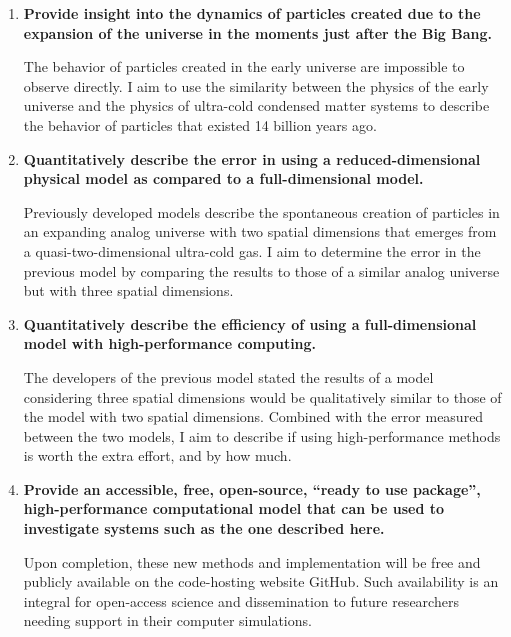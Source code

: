 \documentclass{article}
\begin{document}
        \begin{enumerate}
            \item \textbf{Provide insight into the dynamics of particles created due to the expansion of the universe in the moments just after the Big Bang.}

                The behavior of particles created in the early universe are impossible to observe directly.  I aim to use the similarity between the physics of the early universe and the physics of ultra-cold condensed matter systems to describe the behavior of particles that existed 14 billion years ago.
            
            \item \textbf{Quantitatively describe the error in using a reduced-dimensional physical model as compared to a full-dimensional model.}  
            
                Previously developed models\cite{Jain} describe the spontaneous creation of particles in an expanding analog universe with two spatial dimensions that emerges from a quasi-two-dimensional ultra-cold gas.  I aim to determine the error in the previous model by comparing the results to those of a similar analog universe but with three spatial dimensions.
                
            \item \textbf{Quantitatively describe the efficiency of using a full-dimensional model with high-performance computing.}

                The developers of the previous model\cite{Jain} stated the results of a model considering three spatial dimensions would be qualitatively similar to those of the model with two spatial dimensions.  Combined with the error measured between the two models, I aim to describe if using high-performance methods is worth the extra effort, and by how much.
            
            \item \textbf{Provide an accessible, free, open-source, ``ready to use package'', high-performance computational model that can be used to investigate systems such as the one described here.}

                Upon completion, these new methods and implementation will be free and publicly available on the code-hosting website GitHub.  Such availability is an integral for open-access science and dissemination to future researchers needing support in their computer simulations.
                
        \end{enumerate}
        
\end{document}
